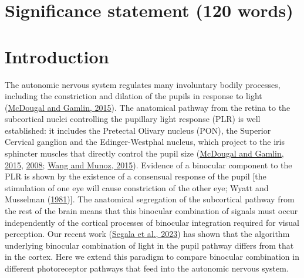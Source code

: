 \documentclass[
]{article}
\begin{document}
\hypertarget{significance-statement-120-words}{%
\section{Significance statement (120 words)}\label{significance-statement-120-words}}

\hypertarget{introduction}{%
\section{Introduction}\label{introduction}}

The autonomic nervous system regulates many involuntary bodily processes, including the constriction and dilation of the pupils in response to light (\protect\hyperlink{ref-McDougal2015}{McDougal and Gamlin, 2015}). The anatomical pathway from the retina to the subcortical nuclei controlling the pupillary light response (PLR) is well established: it includes the Pretectal Olivary nucleus (PON), the Superior Cervical ganglion and the Edinger-Westphal nucleus, which project to the iris sphincter muscles that directly control the pupil size (\protect\hyperlink{ref-McDougal2015}{McDougal and Gamlin, 2015}, \protect\hyperlink{ref-McDougal2008}{2008}; \protect\hyperlink{ref-Wang2015}{Wang and Munoz, 2015}). Evidence of a binocular component to the PLR is shown by the existence of a consensual response of the pupil {[}the stimulation of one eye will cause constriction of the other eye; Wyatt and Musselman (\protect\hyperlink{ref-Wyatt1981}{1981}){]}. The anatomical segregation of the subcortical pathway from the rest of the brain means that this binocular combination of signals must occur independently of the cortical processes of binocular integration required for visual perception. Our recent work (\protect\hyperlink{ref-Segala2023}{Segala et al., 2023}) has shown that the algorithm underlying binocular combination of light in the pupil pathway differs from that in the cortex. Here we extend this paradigm to compare binocular combination in different photoreceptor pathways that feed into the autonomic nervous system.
\end{document}
